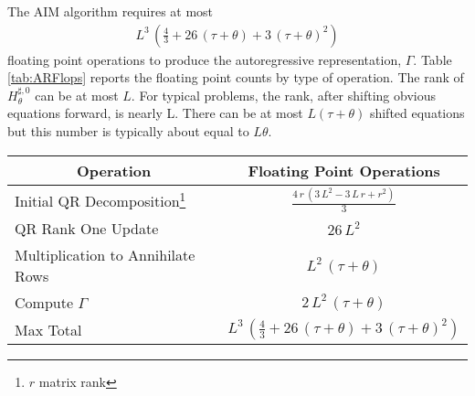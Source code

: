 
The AIM algorithm  requires at most
\begin{gather*}
  {L^3}\,\left( {\frac{4}{3}} + 26\,\left( \tau + \theta \right)  + 
    3\,{{\left( \tau + \theta \right) }^2} \right) 
\end{gather*}
 floating point operations
to produce the autoregressive representation, $\Gamma$.
Table \ref{tab:ARFlops} reports the floating point counts by type of operation.
The rank of $H^{\sharp,0}_\theta$ can be at most $L$. For typical problems,
the rank, after shifting obvious equations forward, is nearly L.  There
can be at most $L(\tau+\theta)$ shifted equations but  this number is typically
about equal to $L\theta$.

\begin{table*}[htbp]
\begin{minipage}{\textwidth}
  \begin{center}
    \leavevmode
    \begin{tabular}{|l|c|}
\hline
\multicolumn{1}{|c|}{Operation}&
\multicolumn{1}{|c|}{Floating Point Operations}\\
\hline
Initial QR Decomposition\footnote{$r$ matrix rank}&${\frac{4\,r\,\left( 3\,{L^2} - 3\,L\,r + {r^2} \right) }{3}}$\\
\hline
QR Rank One Update&$26\,{L^2}$\\
\hline
Multiplication to Annihilate Rows&${L^2}\,\left( \tau + \theta \right) $\\
\hline
Compute $\Gamma$&$2\,{L^2}\,\left( \tau + \theta \right) $\\
\hline
Max Total&${L^3}\,\left( {\frac{4}{3}} + 26\,\left( \tau + \theta \right)  + 
    3\,{{\left( \tau + \theta \right) }^2} \right) $\\
\hline
    \end{tabular}
    \caption{Floating Point Operations to Compute Autoregressive Representation}
    \label{tab:ARFlops}
  \end{center}
\end{minipage}
\end{table*}

